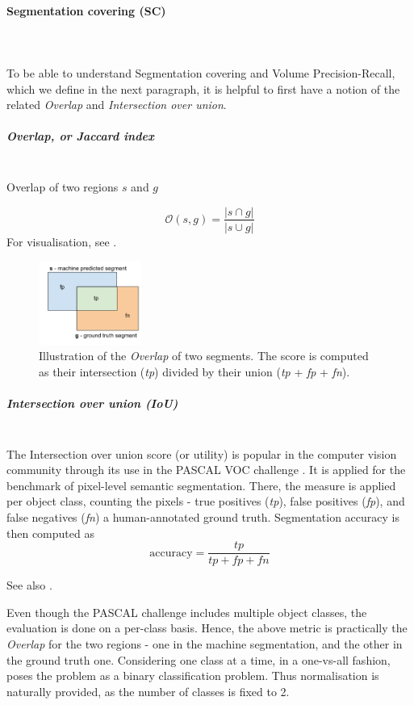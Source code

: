 \paragraph{Segmentation covering (SC)}\mbox{}\\\mbox{}\\
\label{par:ch4-SC-maths}
To be able to understand Segmentation covering and Volume Precision-Recall, which we define in the next paragraph, it is helpful to first have a notion of the related \textit{Overlap} and \textit{Intersection over union}.

\subparagraph{Overlap, or Jaccard index}\mbox{}\\
Overlap of two regions %
$s$ and $g$

\[
\mathcal{O}\left(s,g\right)=\frac{\left|s\cap g\right|}{\left|s\cup g\right|}
\]
For visualisation, see .

\begin{figure}[ht!]
\centering
\includegraphics[width=0.3\textwidth]{images/scoring_fcns/intersection-over-union_score_illustrated.png}
\caption{Illustration of the \textit{Overlap} of two segments. The score is computed as their intersection (\textit{tp}) divided by their union (\textit{tp} + \textit{fp} + \textit{fn}).}
\label{fig:overlap-IoU}
\end{figure}

\subparagraph{Intersection over union (IoU)}\mbox{}\\
The Intersection over union score (or utility) %
is popular in the computer vision community through its use in the PASCAL VOC challenge \cite{PASCAL-voc-2012}. It is applied for the benchmark of pixel-level semantic segmentation. There, the measure is applied per object class, counting the pixels - true positives (\textit{tp}), false positives (\textit{fp}), and false negatives (\textit{fn}) \wrt a human-annotated ground truth. Segmentation accuracy is then computed as
\[
 \text{accuracy} = \frac{\textit{tp}}{\textit{tp} + \textit{fp} + \textit{fn}}
\]

See also .

Even though the PASCAL challenge includes multiple object classes, the evaluation is done on a per-class basis. Hence, the above metric is practically the {\it Overlap} for the two regions - one in the machine segmentation, and the other in the ground truth one. 
Considering one class at a time, in a one-vs-all fashion, poses the problem as a binary classification problem. Thus normalisation is naturally provided, as the number of classes is fixed to 2.

